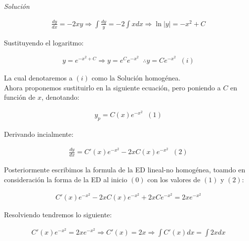 \textit{Solución}

\begin{equation}
    \begin{gathered}
        \frac{dy}{dx}=-2xy \Rightarrow \int\frac{dy}{y}=-2\int xdx \Rightarrow \ln\left|y\right|=-x^{2}+C
    \end{gathered}
\end{equation}

Sustituyendo el logaritmo:

\begin{equation*}
    \begin{gathered}
        y=e^{-x^{2}+C}\Rightarrow y=e^{C}e^{-x^{2}}\;\;\therefore y=Ce^{-x^{2}}\;\;(i)
    \end{gathered}
\end{equation*}

La cual denotaremos a \(\displaystyle(i)\) como la Solución homogénea.\\
Ahora proponemos sustituirlo en la siguiente ecuación, pero poniendo a \(\displaystyle C\) en función de \(\displaystyle x\), denotando:

\begin{equation*}
    \begin{gathered}
        y_{p}=C(x)e^{-x^{2}}\;\;(1)
    \end{gathered}
\end{equation*}

Derivando incialmente:

\begin{equation*}
    \begin{gathered}
        \frac{dy}{dx}=C'(x)e^{-x^{2}}-2xC(x)e^{-x^{2}}\;\;(2)
    \end{gathered}
\end{equation*}

Posteriormente escribimos la formula de la ED lineal-no homogénea, toamdo en consideración la forma de la ED al inicio \(\displaystyle (0)\) con los valores de \(\displaystyle (1)\) y \(\displaystyle (2)\):

\begin{equation*}
    \begin{gathered}
        C'(x)e^{-x^{2}}-2xC(x)e^{-x^{2}}+2xCe^{-x^2}=2xe^{-x^{2}}
    \end{gathered}
\end{equation*}

Resolviendo tendremos lo siguiente:

\begin{equation*}
    \begin{gathered}
        C'(x)e^{-x^{2}}=2xe^{-x^{2}}\Rightarrow C'(x)=2x \Rightarrow \int C'(x)dx=\int 2xdx
    \end{gathered}
\end{equation*}


